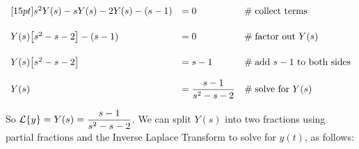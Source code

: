 \documentclass{article}
\theoremstyle{definition}
\begin{document}
\begin{equation*}
\begin{array}{lllll}
[15pt]         
s^2 Y(s) - s Y(s) - 2 Y(s) - (s - 1)                                                                                   &= 0                                                    &\mathrel{\#} \text{collect terms}                                                                                          \\
[15pt]
Y(s) \big [s^2- s - 2 \big] - (s - 1)                                                                                   &= 0                                                     &\mathrel{\#} \text{factor out $Y(s)$}                                                                                   \\
[15pt]
Y(s) \big [s^2- s - 2 \big]                                                                                               &= s - 1                                                &\mathrel{\#} \text{add $s - 1$ to both sides}                                                                      \\
[12pt]
Y(s)                                                                                                                              &= \mathlarger{\frac{s - 1}{s^2 -s -2}}  &\mathrel{\#} \text{solve for $Y(s)$}
\end{array}
\end{equation*}

\bigskip
\noindent
So $\mathcal{L}\{y\} = Y(s) = \mathlarger{\frac{s - 1}{s^2 -s -2}}$. We can split $Y(s)$ into two fractions using partial fractions and the Inverse Laplace Transform 
to solve for $y(t)$, as follows:
\end{document}
